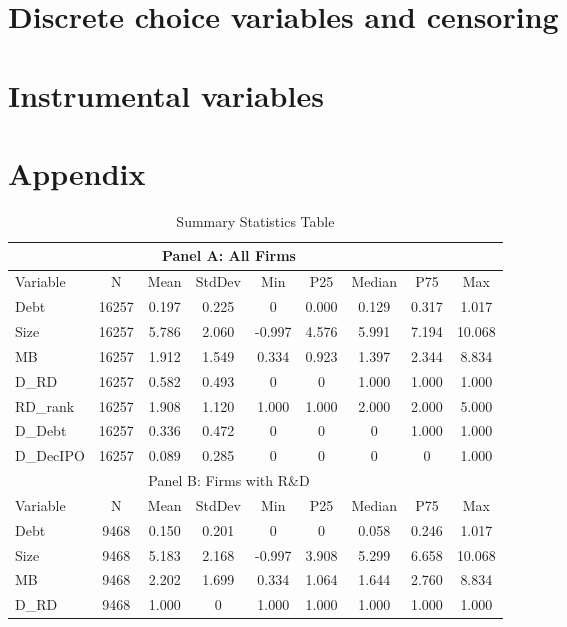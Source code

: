 \documentclass[12pt, times]{article}
\begin{document}
\section*{Discrete choice variables and censoring}

\section*{Instrumental variables}

\section*{Appendix}

\begin{table}[h!]
    \centering
    \caption{Summary Statistics Table}
    \label{table:1}
    \begin{tabular}{lcccccccc}
        \toprule
        \multicolumn{8}{c}{Panel A: All Firms} \\
        \midrule
        Variable & N & Mean & StdDev & Min & P25 & Median & P75 & Max \\
        \midrule
        Debt & 16257 & 0.197 & 0.225 & 0 & 0.000 & 0.129 & 0.317 & 1.017 \\
        Size & 16257 & 5.786 & 2.060 & -0.997 & 4.576 & 5.991 & 7.194 & 10.068 \\
        MB & 16257 & 1.912 & 1.549 & 0.334 & 0.923 & 1.397 & 2.344 & 8.834 \\
        D\_RD & 16257 & 0.582 & 0.493 & 0 & 0 & 1.000 & 1.000 & 1.000 \\
        RD\_rank & 16257 & 1.908 & 1.120 & 1.000 & 1.000 & 2.000 & 2.000 & 5.000 \\
        D\_Debt & 16257 & 0.336 & 0.472 & 0 & 0 & 0 & 1.000 & 1.000 \\
        D\_DecIPO & 16257 & 0.089 & 0.285 & 0 & 0 & 0 & 0 & 1.000 \\
        \midrule
        \multicolumn{8}{c}{Panel B: Firms with R\&D} \\
        \midrule
        Variable & N & Mean & StdDev & Min & P25 & Median & P75 & Max \\
        \midrule
        Debt & 9468 & 0.150 & 0.201 & 0 & 0 & 0.058 & 0.246 & 1.017 \\
        Size & 9468 & 5.183 & 2.168 & -0.997 & 3.908 & 5.299 & 6.658 & 10.068 \\
        MB & 9468 & 2.202 & 1.699 & 0.334 & 1.064 & 1.644 & 2.760 & 8.834 \\
        D\_RD & 9468 & 1.000 & 0 & 1.000 & 1.000 & 1.000 & 1.000 & 1.000 \\

\end{tabular}
\end{table}
\end{document}
